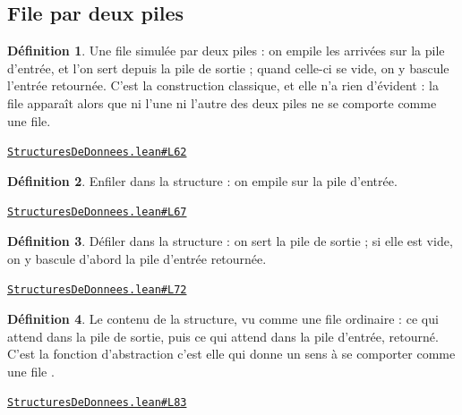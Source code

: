 \documentclass[11pt,a4paper]{article}
\theoremstyle{definition}
\newtheorem{definition}{Définition}
\theoremstyle{plain}
\newcommand{\source}[2]{\par\smallskip\noindent\hfill{\footnotesize\href{#1}{\texttt{#2}}}\par\smallskip}
\begin{document}
\subsection{File par deux piles}

\begin{definition}
Une file simulée par deux piles : on empile les arrivées sur la pile d'entrée, et
l'on sert depuis la pile de sortie ; quand celle-ci se vide, on y bascule l'entrée
retournée. C'est la construction classique, et elle n'a rien d'évident : la file
apparaît alors que ni l'une ni l'autre des deux piles ne se comporte comme une file.
\end{definition}
\source{https://github.com/Commutator-IO/learn-lean/blob/main/courses/02-lycee/11-informatique-nsi/StructuresDeDonnees.lean\#L62}{StructuresDeDonnees.lean\#L62}

\begin{definition}
Enfiler dans la structure : on empile sur la pile d'entrée.
\end{definition}
\source{https://github.com/Commutator-IO/learn-lean/blob/main/courses/02-lycee/11-informatique-nsi/StructuresDeDonnees.lean\#L67}{StructuresDeDonnees.lean\#L67}

\begin{definition}
Défiler dans la structure : on sert la pile de sortie ; si elle est vide, on y
bascule d'abord la pile d'entrée retournée.
\end{definition}
\source{https://github.com/Commutator-IO/learn-lean/blob/main/courses/02-lycee/11-informatique-nsi/StructuresDeDonnees.lean\#L72}{StructuresDeDonnees.lean\#L72}

\begin{definition}
Le contenu de la structure, vu comme une file ordinaire : ce qui attend dans la
pile de sortie, puis ce qui attend dans la pile d'entrée, retourné. C'est la fonction
d'abstraction \textemdash{} c'est elle qui donne un sens à \og{} se comporter comme une file \fg{}.
\end{definition}
\source{https://github.com/Commutator-IO/learn-lean/blob/main/courses/02-lycee/11-informatique-nsi/StructuresDeDonnees.lean\#L83}{StructuresDeDonnees.lean\#L83}
\end{document}
